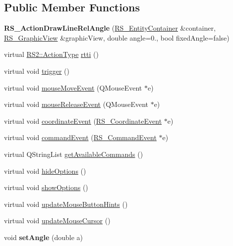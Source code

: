 \subsection*{Public Member Functions}
\begin{DoxyCompactItemize}
\item 
\hypertarget{classRS__ActionDrawLineRelAngle_abef7b1c3363ded3ddafbc299366e0d58}{{\bfseries R\-S\-\_\-\-Action\-Draw\-Line\-Rel\-Angle} (\hyperlink{classRS__EntityContainer}{R\-S\-\_\-\-Entity\-Container} \&container, \hyperlink{classRS__GraphicView}{R\-S\-\_\-\-Graphic\-View} \&graphic\-View, double angle=0., bool fixed\-Angle=false)}\label{classRS__ActionDrawLineRelAngle_abef7b1c3363ded3ddafbc299366e0d58}

\item 
virtual \hyperlink{classRS2_afe3523e0bc41fd637b892321cfc4b9d7}{R\-S2\-::\-Action\-Type} \hyperlink{classRS__ActionDrawLineRelAngle_a6d20488a6c1b69c3a0b26be227b10433}{rtti} ()
\item 
virtual void \hyperlink{classRS__ActionDrawLineRelAngle_a853749201786879b2587b2b6caf9b363}{trigger} ()
\item 
virtual void \hyperlink{classRS__ActionDrawLineRelAngle_ac6ff62c5c8adbef05ee4d97215807a95}{mouse\-Move\-Event} (Q\-Mouse\-Event $\ast$e)
\item 
virtual void \hyperlink{classRS__ActionDrawLineRelAngle_a4de1252ee05399260990d52792add36c}{mouse\-Release\-Event} (Q\-Mouse\-Event $\ast$e)
\item 
virtual void \hyperlink{classRS__ActionDrawLineRelAngle_ae37b576a0197c53b6b33e7f78965a732}{coordinate\-Event} (\hyperlink{classRS__CoordinateEvent}{R\-S\-\_\-\-Coordinate\-Event} $\ast$e)
\item 
virtual void \hyperlink{classRS__ActionDrawLineRelAngle_a80bcf92fa334e41bfecb50c7889e0f7f}{command\-Event} (\hyperlink{classRS__CommandEvent}{R\-S\-\_\-\-Command\-Event} $\ast$e)
\item 
virtual Q\-String\-List \hyperlink{classRS__ActionDrawLineRelAngle_a26fdcdaa7428693b0537c02264c03b9a}{get\-Available\-Commands} ()
\item 
virtual void \hyperlink{classRS__ActionDrawLineRelAngle_a03860d34a18e8081ad07509ab19a277f}{hide\-Options} ()
\item 
virtual void \hyperlink{classRS__ActionDrawLineRelAngle_a657dcce7548b0a76ab70f4bb8c0d39b0}{show\-Options} ()
\item 
virtual void \hyperlink{classRS__ActionDrawLineRelAngle_a495740611b713141c47bcab8993ed160}{update\-Mouse\-Button\-Hints} ()
\item 
virtual void \hyperlink{classRS__ActionDrawLineRelAngle_a99013256d4346ea2b55db66c0a7ed0bc}{update\-Mouse\-Cursor} ()
\item 
\hypertarget{classRS__ActionDrawLineRelAngle_aa6fba69661ccc4e0c0fb2b11da2551bd}{void {\bfseries set\-Angle} (double a)}\label{classRS__ActionDrawLineRelAngle_aa6fba69661ccc4e0c0fb2b11da2551bd}


\end{DoxyCompactItemize}
